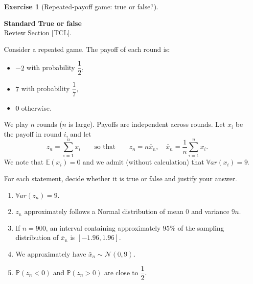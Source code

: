\documentclass[
  11pt,
]{book}
\theoremstyle{definition}
\theoremstyle{definition}
\theoremstyle{definition}
\newtheorem{exercise}{Exercise}[chapter]
\theoremstyle{definition}
\theoremstyle{remark}
\begin{document}
\begin{exercisebox}

\begin{exercise}[Repeated-payoff game: true or false?]
\protect\hypertarget{exr:clt-payoff-true-false}{}\label{exr:clt-payoff-true-false}

\textbf{Standard \textbar{} True or false}\\
Review Section \ref{TCL}.

Consider a repeated game. The payoff of each round is:

\begin{itemize}
\item
  \(-2\) with probability \(\dfrac{1}{2}\),
\item
  \(7\) with probability \(\dfrac{1}{7}\),
\item
  \(0\) otherwise.
\end{itemize}

We play \(n\) rounds (\(n\) is large). Payoffs are independent across rounds. Let \(x_i\) be the payoff in round \(i\), and let \[z_n=\sum_{i=1}^n x_i
\qquad\text{so that}\qquad
z_n=n\bar{x}_n,
\quad
\bar{x}_n=\frac{1}{n}\sum_{i=1}^n x_i.\] We note that \(\mathbb{E}(x_i)=0\) and we admit (without calculation) that \(\mathbb{V}ar(x_i)=9\).

For each statement, decide whether it is true or false and justify your answer.

\begin{enumerate}
\def\labelenumi{\arabic{enumi}.}
\item
  \(\mathbb{V}ar(z_n)=9\).
\item
  \(z_n\) approximately follows a Normal distribution of mean \(0\) and variance \(9n\).
\item
  If \(n=900\), an interval containing approximately 95\% of the sampling distribution of \(\bar{x}_n\) is \([-1.96,1.96]\).
\item
  We approximately have \(\bar{x}_n \sim \mathcal{N}(0,9)\).
\item
  \(\mathbb{P}(z_n<0)\) and \(\mathbb{P}(z_n>0)\) are close to \(\dfrac{1}{2}\).
\end{enumerate}

\end{exercise}

\end{exercisebox}

\end{document}

